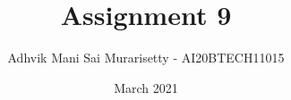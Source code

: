 \documentclass[journal,12pt,twocolumn]{IEEEtran}
\date{March 2021}
\DeclareMathOperator*{\Res}{Res}
\begin{document}
\newcommand{\BEQA}{\begin{eqnarray}}
\newcommand{\EEQA}{\end{eqnarray}}
\newcommand{\define}{\stackrel{\triangle}{=}}

\raggedbottom
\setlength{\parindent}{0pt}
\providecommand{\mbf}{\mathbf}
\providecommand{\pr}[1]{\ensuremath{\Pr\left(#1\right)}}
\providecommand{\qfunc}[1]{\ensuremath{Q\left(#1\right)}}
\providecommand{\fn}[1]{\ensuremath{f\left({#1}\right)}}
\providecommand{\e}[1]{\ensuremath{E\left(#1\right)}}
\providecommand{\sbrak}[1]{\ensuremath{{}\left[#1\right]}}
\providecommand{\lsbrak}[1]{\ensuremath{{}\left[#1\right.}}
\providecommand{\rsbrak}[1]{\ensuremath{{}\left.#1\right]}}
\providecommand{\brak}[1]{\ensuremath{\left(#1\right)}}
\providecommand{\lbrak}[1]{\ensuremath{\left(#1\right.}}
\providecommand{\rbrak}[1]{\ensuremath{\left.#1\right)}}
\providecommand{\cbrak}[1]{\ensuremath{\left\{#1\right\}}}
\providecommand{\lcbrak}[1]{\ensuremath{\left\{#1\right.}}
\providecommand{\rcbrak}[1]{\ensuremath{\left.#1\right\}}}
\theoremstyle{remark}
\newtheorem{rem}{Remark}
\newcommand{\sgn}{\mathop{\mathrm{sgn}}}
\newcommand{\comb}[2]{{}^{#1}\mathrm{C}_{#2}}
\providecommand{\abs}[1]{\vert#1\vert}
\providecommand{\res}[1]{\Res\displaylimits_{#1}} 
\providecommand{\norm}[1]{\lVert#1\rVert}
\providecommand{\mtx}[1]{\mathbf{#1}}
\providecommand{\mean}[1]{E\sbrak{ #1 }}
\providecommand{\fourier}{\overset{\mathcal{F}}{ \rightleftharpoons}}
\providecommand{\system}{\overset{\mathcal{H}}{ \longleftrightarrow}}
\newcommand{\solution}{\noindent \textbf{Solution: }}
\newcommand{\cosec}{\,\text{cosec}\,}
\providecommand{\dec}[2]{\ensuremath{\overset{#1}{\underset{#2}{\gtrless}}}}
\newcommand{\myvec}[1]{\ensuremath{\begin{pmatrix}#1\end{pmatrix}}}
\newcommand{\mydet}[1]{\ensuremath{\begin{vmatrix}#1\end{vmatrix}}}
\makeatletter
\vspace{3cm}
\title{Assignment 9}
\author{Adhvik Mani Sai Murarisetty - AI20BTECH11015}
\maketitle
\newpage
\bigskip
\renewcommand{\thetable}{\theenumi}
\end{document}
